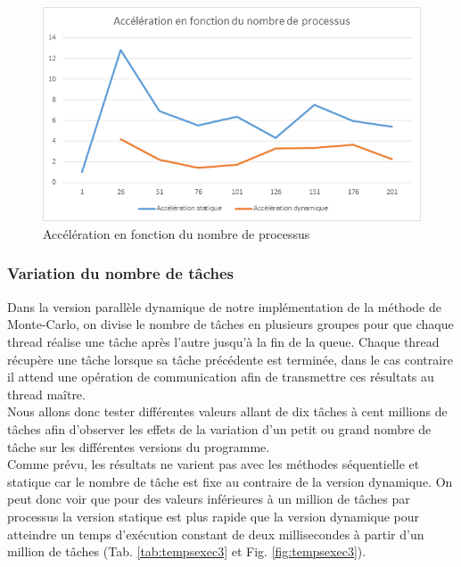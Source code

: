 \documentclass[a4paper,12pt]{article}
\begin{document}
\begin{figure}[H]
\center \includegraphics[width=15cm]{acc2} %
\caption{Accélération en fonction du nombre de processus}
\label{fig:acc2}
\end{figure}


\subsubsection{Variation du nombre de tâches}
Dans la version parallèle dynamique de notre implémentation de la méthode de Monte-Carlo, on divise le nombre de tâches en plusieurs groupes pour que chaque thread réalise une tâche après l'autre jusqu'à la fin de la queue. Chaque thread récupère une tâche lorsque sa tâche précédente est terminée, dans le cas contraire il attend une opération de communication afin de transmettre ces résultats au thread maître. \\
Nous allons donc tester différentes valeurs allant de dix tâches à cent millions de tâches afin d'observer les effets de la variation d'un petit ou grand nombre de tâche sur les différentes versions du programme.\\
Comme prévu, les résultats ne varient pas avec les méthodes séquentielle et statique car le nombre de tâche est fixe au contraire de la version dynamique. On peut donc voir que pour des valeurs inférieures à un million de tâches par processus la version statique est plus rapide que la version dynamique pour atteindre un temps d'exécution constant de deux millisecondes à partir d'un million de tâches (Tab. \ref{tab:tempsexec3} et Fig. \ref{fig:tempsexec3}). 
\end{document}
